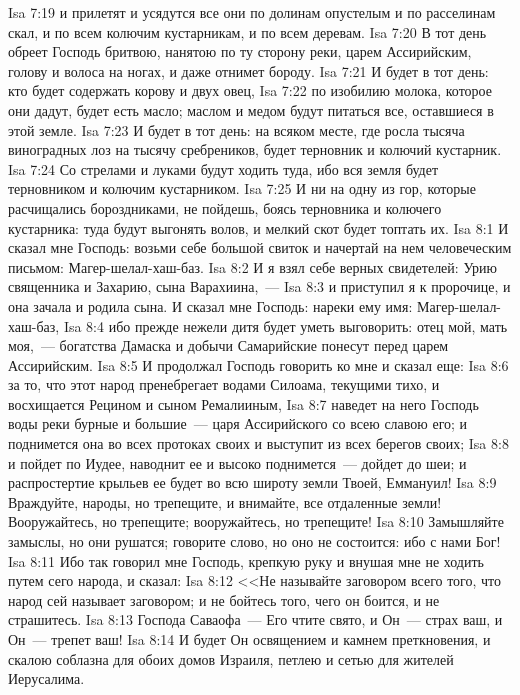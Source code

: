 \vs Isa 7:19 и прилетят и усядутся все они по долинам опустелым и по расселинам скал, и по всем колючим кустарникам, и по всем деревам.
\vs Isa 7:20 В тот день обреет Господь бритвою, нанятою по ту сторону реки, царем Ассирийским, голову и волоса на ногах, и даже отнимет бороду.
\vs Isa 7:21 И будет в тот день: кто будет содержать корову и двух овец,
\vs Isa 7:22 по изобилию молока, которое они дадут, будет есть масло; маслом и медом будут питаться все, оставшиеся в этой земле.
\vs Isa 7:23 И будет в тот день: на всяком месте, где росла тысяча виноградных лоз на тысячу сребреников, будет терновник и колючий кустарник.
\vs Isa 7:24 Со стрелами и луками будут ходить туда, ибо вся земля будет терновником и колючим кустарником.
\vs Isa 7:25 И ни на одну из гор, которые расчищались бороздниками, не пойдешь, боясь терновника и колючего кустарника: туда будут выгонять волов, и мелкий скот будет топтать их.
\vs Isa 8:1 И сказал мне Господь: возьми себе большой свиток и начертай на нем человеческим письмом: Магер-шелал-хаш-баз.
\vs Isa 8:2 И я взял себе верных свидетелей: Урию священника и Захарию, сына Варахиина,~---
\vs Isa 8:3 и приступил я к пророчице, и она зачала и родила сына. И сказал мне Господь: нареки ему имя: Магер-шелал-хаш-баз,
\vs Isa 8:4 ибо прежде нежели дитя будет уметь выговорить: отец мой, мать моя,~--- богатства Дамаска и добычи Самарийские понесут перед царем Ассирийским.
\rsbpar\vs Isa 8:5 И продолжал Господь говорить ко мне и сказал еще:
\vs Isa 8:6 за то, что этот народ пренебрегает водами Силоама, текущими тихо, и восхищается Рецином и сыном Ремалииным,
\vs Isa 8:7 наведет на него Господь воды реки бурные и большие~--- царя Ассирийского со всею славою его; и поднимется она во всех протоках своих и выступит из всех берегов своих;
\vs Isa 8:8 и пойдет по Иудее, наводнит ее и высоко поднимется~--- дойдет до шеи; и распростертие крыльев ее будет во всю широту земли Твоей, Еммануил!
\vs Isa 8:9 Враждуйте, народы, но трепещите, и внимайте, все отдаленные земли! Вооружайтесь, но трепещите; вооружайтесь, но трепещите!
\vs Isa 8:10 Замышляйте замыслы, но они рушатся; говорите слово, но оно не состоится: ибо с нами Бог!
\vs Isa 8:11 Ибо так говорил мне Господь,  крепкую руку и внушая мне не ходить путем сего народа, и сказал:
\vs Isa 8:12 <<Не называйте заговором всего того, что народ сей называет заговором; и не бойтесь того, чего он боится, и не страшитесь.
\vs Isa 8:13 Господа Саваофа~--- Его чтите свято, и Он~--- страх ваш, и Он~--- трепет ваш!
\vs Isa 8:14 И будет Он освящением и камнем преткновения, и скалою соблазна для обоих домов Израиля, петлею и сетью для жителей Иерусалима.
